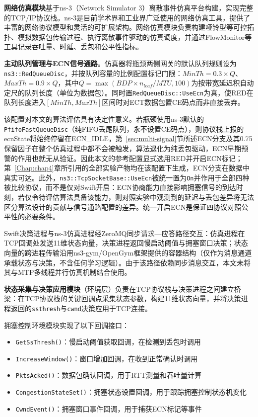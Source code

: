 \textbf{网络仿真模块}基于ns-3（Network Simulator 3）离散事件仿真平台构建，实现完整的TCP/IP协议栈。ns-3是目前学术界和工业界广泛使用的网络仿真工具，提供了丰富的网络协议模型和灵活的可扩展架构。网络仿真模块负责构建哑铃型等可控拓扑、模拟数据包传输过程、执行离散事件驱动的仿真调度，并通过FlowMonitor等工具记录吞吐量、时延、丢包和公平性指标。

\textbf{主动队列管理与ECN信号通路}。仿真器将瓶颈两侧网关的默认队列规则设为\texttt{ns3::RedQueueDisc}，并按队列容量的比例配置标记门限：$MinTh = 0.3 \times Q$、$MaxTh = 0.9 \times Q$，其中$Q = \max(BDP \times n_{leaf} / MTU, 100)$为按带宽延迟积自动定尺的队列长度（单位为数据包）。同时置\texttt{RedQueueDisc::UseEcn}为真，使RED在队列长度进入$[MinTh, MaxTh]$区间时对ECT数据包置CE码点而非直接丢弃。

该配置对本文的算法评估具有决定性意义。若瓶颈使用ns-3默认的\texttt{PfifoFastQueueDisc}（纯FIFO丢尾队列，永不设置CE码点），则协议栈上报的ecnState将始终停留在ECN\_IDLE，第~\ref{sec:multi-signal}节所述ECN分支及其0.75保留因子在整个仿真过程中都不会被触发，算法退化为纯丢包驱动，ECN早期预警的作用也就无从验证。因此本文的参考配置显式选用RED并开启ECN标记；第~\ref{Chap:chap4}章所引用的全部实验产物均在该配置下生成，ECN分支在数据中真实可达。此外，\texttt{ns3::TcpSocketBase::UseEcn}被统一置为\texttt{On}并作用于全部四种被比较协议，而不是仅对Swift开启：ECN协商能力直接影响拥塞信号的到达时刻，若仅令待评估算法具备该能力，则对照实验中观测到的延迟与丢包差异将无法区分算法设计的贡献与信号通路配置的差异。统一开启ECN是保证四协议对照公平性的必要条件。

Swift决策进程与ns-3仿真进程经ZeroMQ同步请求—应答路径交互：仿真进程在TCP回调处发送11维状态向量，决策进程返回慢启动阈值与拥塞窗口决策；状态向量的跨进程传输沿用ns3-gym/OpenGym框架提供的容器结构（仅作为消息通道承载状态与决策，不含任何学习逻辑）。由于该路径依赖同步消息交互，本文未将其与MTP多线程并行仿真机制结合使用。

\textbf{状态采集与决策应用模块}（环境层）负责在TCP协议栈与决策进程之间建立桥梁：在TCP协议栈的关键回调点采集状态参数，构建11维状态向量，并将决策进程返回的\texttt{ssthresh}与\texttt{cwnd}决策应用于TCP连接。

拥塞控制环境模块实现了以下回调接口：

\begin{itemize}
    \item \texttt{GetSsThresh()}：慢启动阈值获取回调，在检测到丢包时调用
    \item \texttt{IncreaseWindow()}：窗口增加回调，在收到正常确认时调用
    \item \texttt{PktsAcked()}：数据包确认回调，用于RTT测量和吞吐量计算
    \item \texttt{CongestionStateSet()}：拥塞状态设置回调，用于跟踪拥塞控制状态机变化
    \item \texttt{CwndEvent()}：拥塞窗口事件回调，用于捕获ECN标记等事件
\end{itemize}

